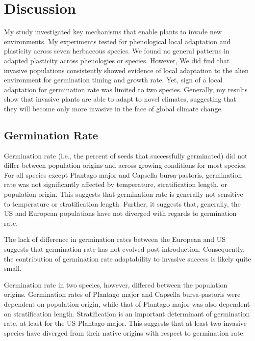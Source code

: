 \documentclass[12pt]{article}\usepackage[]{graphicx}\usepackage[]{color}
\begin{document}
	\section{Discussion} 
	
	My study investigated key mechanisms that enable plants to invade new environments. My experiments tested for phenological local adaptation and plasticity across seven herbaceous species. We found no general patterns in adapted plasticity across phenologies or species.  However, We did find that invasive populations consistently showed evidence of local adaptation to the alien environment for germination timing and growth rate. Yet, sign of a local adaptation for germination rate was limited to two species.  Generally, my results show that invasive plants are able to adapt to novel climates, suggesting that they will become only more invasive in the face of global climate change. 
	
	\subsection{Germination Rate} 
	
	
	Germination rate (i.e., the percent of seeds that successfully germinated) did not differ between population origins and across growing conditions for most species. For all species except Plantago major and Capsella bursa-pastoris, germination rate was not significantly affected by temperature, stratification length, or population origin. This suggests that germination rate is generally not sensitive to temperature or stratification length. Further, it suggests that, generally, the US and European populations have not diverged with regards to germination rate. 
	
	The lack of difference in germination rates between the European and US suggests that germination rate has not evolved post-introduction. Consequently, the contribution of germination rate adaptability to invasive success is likely quite small. 
	
	Germination rate in two species, however, differed between the population origins. Germination rates of Plantago major and Capsella bursa-pastoris were dependent on population origin, while that of Plantago major was also dependent on stratification length. Stratification is an important determinant of germination rate, at least for the US Plantago major. This suggests that at least two invasive species have diverged from their native origins with respect to germination rate. 
	
\end{document}
